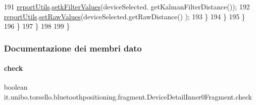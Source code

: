 \begin{DoxyCode}
191                             \hyperlink{classit_1_1unibo_1_1torsello_1_1bluetoothpositioning_1_1fragment_1_1DeviceDetailInner0Fragment_aaca0aaeea8b6532c9e2683d415adfc59_aaca0aaeea8b6532c9e2683d415adfc59}{reportUtils}.\hyperlink{classit_1_1unibo_1_1torsello_1_1bluetoothpositioning_1_1util_1_1ReportUtils_a081697bebaa8ef8f7d245f9a7da917fa_a081697bebaa8ef8f7d245f9a7da917fa}{setkFilterValues}(deviceSelected.
      getKalmanFilterDistance());
192                             \hyperlink{classit_1_1unibo_1_1torsello_1_1bluetoothpositioning_1_1fragment_1_1DeviceDetailInner0Fragment_aaca0aaeea8b6532c9e2683d415adfc59_aaca0aaeea8b6532c9e2683d415adfc59}{reportUtils}.\hyperlink{classit_1_1unibo_1_1torsello_1_1bluetoothpositioning_1_1util_1_1ReportUtils_a6a65fe55f37edba3871801600cdf48f4_a6a65fe55f37edba3871801600cdf48f4}{setRawValues}(deviceSelected.getRawDistance()
      );
193                         \}
194                     \}
195                 \}
196             \}
197         \}
198 
199     \}
\end{DoxyCode}


\subsubsection{Documentazione dei membri dato}
\hypertarget{classit_1_1unibo_1_1torsello_1_1bluetoothpositioning_1_1fragment_1_1DeviceDetailInner0Fragment_a9ced7df275f9d6ce94f9ade16c0b2920_a9ced7df275f9d6ce94f9ade16c0b2920}{}\label{classit_1_1unibo_1_1torsello_1_1bluetoothpositioning_1_1fragment_1_1DeviceDetailInner0Fragment_a9ced7df275f9d6ce94f9ade16c0b2920_a9ced7df275f9d6ce94f9ade16c0b2920} 
\paragraph{\texorpdfstring{check}{check}}
{\footnotesize\ttfamily boolean it.\+unibo.\+torsello.\+bluetoothpositioning.\+fragment.\+Device\+Detail\+Inner0\+Fragment.\+check\hspace{0.3cm}{\ttfamily [private]}}

